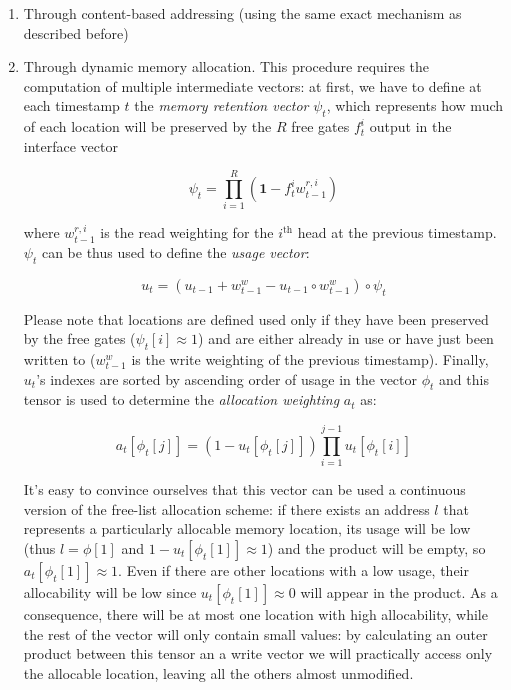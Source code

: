 \documentclass{article}
\begin{document}
\begin{enumerate}
    \item Through content-based addressing (using the same exact mechanism as described before)
    \item Through dynamic memory allocation. This procedure requires the computation of multiple intermediate vectors: at first, we have to define at each timestamp $t$ the \textit{memory retention vector} $\psi_t$, which represents how much of each location will be preserved by the $R$ free gates $f_t^i$ output in the interface vector

    \begin{equation}
        \psi_t = \prod_{i=1}^R (\mathbf{1}- f_t^i w_{t-1}^{r,i})
    \end{equation}

    where $w_{t-1}^{r,i}$ is the read weighting for the $i^{\textrm{th}}$ head at the previous timestamp. $\psi_t$ can be thus used to define the \textit{usage vector}:

    \begin{equation}
        u_t = (u_{t-1}+w_{t-1}^w-u_{t-1} \circ w_{t-1}^w) \circ \psi_t
    \end{equation}

    Please note that locations are defined used only if they have been preserved by the free gates ($\psi_t[i] \approx 1$) and are either already in use or have just been written to ($w_{t-1}^w$ is the write weighting of the previous timestamp).
    Finally, $u_t$'s indexes are sorted by ascending order of usage in the vector $\phi_t$ and this tensor is used to determine the \textit{allocation weighting} $a_t$ as:

    \begin{equation}\label{eq:allocation}
        a_t[\phi_t[j]] = (1-u_t[\phi_t[j]]) \prod_{i=1}^{j-1} u_t[\phi_t[i]]
    \end{equation}

    It's easy to convince ourselves that this vector can be used a continuous version of the free-list allocation scheme: if there exists an address $l$ that represents a particularly allocable memory location, its usage will be low (thus $l=\phi[1]$ and $1-u_t[\phi_t[1]] \approx 1$) and the product will be empty, so $a_t[\phi_t[1]] \approx 1$. Even if there are other locations with a low usage, their allocability will be low since $u_t[\phi_t[1]] \approx 0$ will appear in the product. As a consequence, there will be at most one location with high allocability, while the rest of the vector will only contain small values: by calculating an outer product between this tensor an a write vector we will practically access only the allocable location, leaving all the others almost unmodified.
\end{enumerate}
\end{document}

